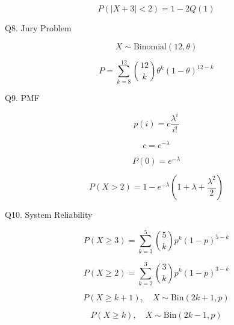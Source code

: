 \documentclass{article}
\begin{document}
\[
P(|X+3| < 2) = 1 - 2Q(1)
\]


Q8. Jury Problem

\[
X \sim \text{Binomial}(12, \theta)
\]

\[
P = \sum_{k=8}^{12} \binom{12}{k} \theta^k (1-\theta)^{12-k}
\]

Q9. PMF

\[
p(i) = c \frac{\lambda^i}{i!}
\]

\[
c = e^{-\lambda}
\]

\[
P(0) = e^{-\lambda}
\]

\[
P(X > 2) = 1 - e^{-\lambda} \left(1 + \lambda + \frac{\lambda^2}{2}\right)
\]


Q10. System Reliability

\[
P(X \ge 3) = \sum_{k=3}^{5} \binom{5}{k} p^k (1-p)^{5-k}
\]

\[
P(X \ge 2) = \sum_{k=2}^{3} \binom{3}{k} p^k (1-p)^{3-k}
\]

\[
P(X \ge k+1), \quad X \sim \text{Bin}(2k+1, p)
\]

\[
P(X \ge k), \quad X \sim \text{Bin}(2k-1, p)
\]
\end{document}
